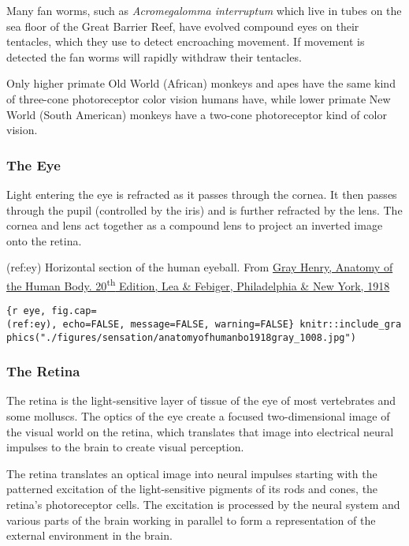 Many fan worms, such as \emph{Acromegalomma interruptum} which live in
tubes on the sea floor of the Great Barrier Reef, have evolved compound
eyes on their tentacles, which they use to detect encroaching movement.
If movement is detected the fan worms will rapidly withdraw their
tentacles.

Only higher primate Old World (African) monkeys and apes have the same
kind of three-cone photoreceptor color vision humans have, while lower
primate New World (South American) monkeys have a two-cone photoreceptor
kind of color vision.

\hypertarget{the-eye}{%
\subsubsection{The Eye}\label{the-eye}}

Light entering the eye is refracted as it passes through the cornea. It
then passes through the pupil (controlled by the iris) and is further
refracted by the lens. The cornea and lens act together as a compound
lens to project an inverted image onto the retina.

(ref:ey) Horizontal section of the human eyeball. From
\href{https://archive.org/details/anatomyofhumanbo1918gray/page/n6/mode/2up}{Gray
Henry, Anatomy of the Human Body. 20\textsuperscript{th} Edition, Lea \&
Febiger, Philadelphia \& New York, 1918}

\texttt{\{r\ eye,\ fig.cap=\textquotesingle{}(ref:ey)\textquotesingle{},\ echo=FALSE,\ message=FALSE,\ warning=FALSE\}\ knitr::include\_graphics("./figures/sensation/anatomyofhumanbo1918gray\_1008.jpg")}

\hypertarget{the-retina}{%
\subsubsection{The Retina}\label{the-retina}}

The retina is the light-sensitive layer of tissue of the eye of most
vertebrates and some molluscs. The optics of the eye create a focused
two-dimensional image of the visual world on the retina, which
translates that image into electrical neural impulses to the brain to
create visual perception.

The retina translates an optical image into neural impulses starting
with the patterned excitation of the light-sensitive pigments of its
rods and cones, the retina's photoreceptor cells. The excitation is
processed by the neural system and various parts of the brain working in
parallel to form a representation of the external environment in the
brain.

